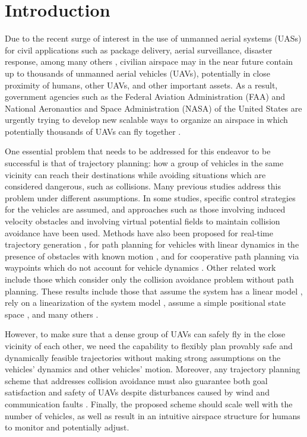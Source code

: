 \section{Introduction \label{sec:introduction}}
Due to the recent surge of interest in the use of unmanned aerial systems (UASs) for civil applications such as package delivery, aerial surveillance, disaster response, among many others \cite{Tice91, Debusk10, Amazon16, AUVSI16, BBC16}, civilian airspace may in the near future contain up to thousands of unmanned aerial vehicles (UAVs), potentially in close proximity of humans, other UAVs, and other important assets. As a result, government agencies such as the Federal Aviation Administration (FAA) and National Aeronautics and Space Administration (NASA) of the United States are urgently trying to develop new scalable ways to organize an airspace in which potentially thousands of UAVs can fly together \cite{FAA13, Kopardekar16}.

One essential problem that needs to be addressed for this endeavor to be successful is that of trajectory planning: how a group of vehicles in the same vicinity can reach their destinations while avoiding situations which are considered dangerous, such as collisions. Many previous studies address this problem under different assumptions. In some studies, specific control strategies for the vehicles are assumed, and approaches such as those involving induced velocity obstacles \cite{Fiorini98, Chasparis05, Vandenberg08,Wu2012} and involving virtual potential fields to maintain collision avoidance \cite{Olfati-Saber2002, Chuang07} have been used. Methods have also been proposed for real-time trajectory generation \cite{Feng-LiLian2002}, for path planning for vehicles with linear dynamics in the presence of obstacles with known motion \cite{Ahmadzadeh2009}, and for cooperative path planning via waypoints which do not account for vehicle dynamics \cite{Bellingham}. Other related work include those which consider only the collision avoidance problem without path planning. These results include those that assume the system has a linear model \cite{Beard2003, Schouwenaars2004, Stipanovic2007}, rely on a linearization of the system model \cite{Massink2001, Althoff2011}, assume a simple positional state space \cite{Lin2015}, and many others \cite{Lalish2008, Hoffmann2008, Chen2016}.

However, to make sure that a dense group of UAVs can safely fly in the close vicinity of each other, we need the capability to flexibly plan provably safe and dynamically feasible trajectories without making strong assumptions on the vehicles' dynamics and other vehicles' motion. Moreover, any trajectory planning scheme that addresses collision avoidance must also guarantee both goal satisfaction and safety of UAVs despite disturbances caused by wind and communication faults \cite{Kopardekar16}. Finally, the proposed scheme should scale well with the number of vehicles, as well as result in an intuitive airspace structure for humans to monitor and potentially adjust.

